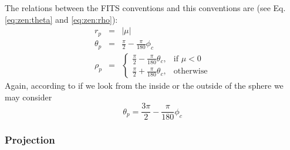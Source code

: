   The relations between the FITS conventions and this conventions are (see Eq. \ref{eq:zen:theta} and \ref{eq:zen:rho}):
  \begin{eqnarray}
    r_p & = & |\mu| \\
    \theta_p & = & \frac{\pi}{2} - \frac{\pi}{180}\phi_c     \\
    \rho_p & = & 
        \begin{cases}
           \frac{\pi}{2} - \frac{\pi}{180}\theta_c,& \text{if } \mu < 0 \\
           \frac{\pi}{2} + \frac{\pi}{180}\theta_c,& \text{otherwise}
        \end{cases}
  \end{eqnarray}
  Again, according to if we look from the inside or the outside of the sphere
  we may consider
  \begin{equation}
    \theta_p = \frac{3\pi}{2} - \frac{\pi}{180}\phi_c
  \end{equation}

\subsubsection{Projection}

